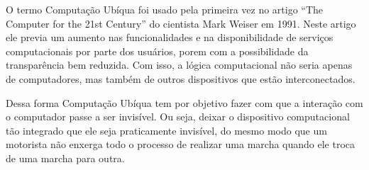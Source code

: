 \documentclass[12pt,a4paper,compsoc]{IEEEtran}
\begin{document}
O termo Computação Ubíqua foi usado pela primeira vez no artigo “The Computer for the 21st Century” do cientista Mark Weiser em 1991. Neste artigo ele previa um aumento nas funcionalidades e na disponibilidade de serviços computacionais por parte dos usuários, porem com a possibilidade da transparência bem reduzida. Com isso, a lógica computacional não seria apenas de computadores, mas também de outros dispositivos que estão interconectados.


Dessa forma Computação Ubíqua tem por objetivo fazer com que a interação com o computador passe a ser invisível. Ou seja, deixar o dispositivo computacional tão integrado que ele seja praticamente invisível, do mesmo modo que um motorista não enxerga todo o processo de realizar uma marcha quando ele troca de uma marcha para outra.
\end{document}
